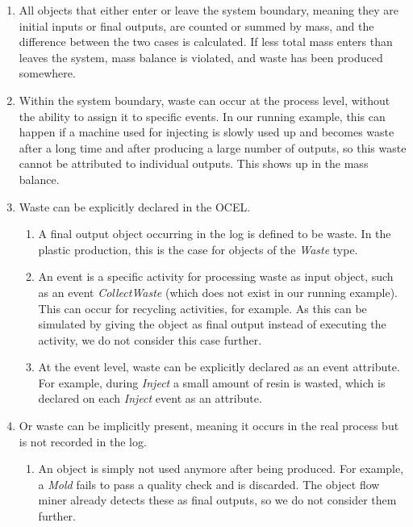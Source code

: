 \begin{enumerate}
    \item 
    \label{item:mass-balance}
    All objects that either enter or leave the system boundary, meaning they are initial inputs or final outputs, are counted or summed by mass, and the difference between the two cases is calculated.
    If less total mass enters than leaves the system, mass balance is violated, and waste has been produced somewhere.
    
    \item
    \label{item:entire-process}
    Within the system boundary, waste can occur at the process level, without the ability to assign it to specific events.
    In our running example, this can happen if a machine used for injecting is slowly used up and becomes waste after a long time and after producing a large number of outputs, so this waste cannot be attributed to individual outputs.
    This shows up in the mass balance.
    
    \item Waste can be explicitly declared in the OCEL.
    \begin{enumerate}
        \item
        A final output object occurring in the log is defined to be waste.
        In the plastic production, this is the case for objects of the \emph{Waste} type.
        
        \item
        An event is a specific activity for processing waste as input object, such as an event \emph{CollectWaste} (which does not exist in our running example).
        This can occur for recycling activities, for example.
        As this can be simulated by giving the object as final output instead of executing the activity, we do not consider this case further.

        \item
        At the event level, waste can be explicitly declared as an event attribute.
        For example, during \emph{Inject} a small amount of resin is wasted, which is declared on each \emph{Inject} event as an attribute.
    \end{enumerate}
    
    \item
    Or waste can be implicitly present, meaning it occurs in the real process but is not recorded in the log.
    \begin{enumerate}
        \item
        An object is simply not used anymore after being produced.
        For example, a \emph{Mold} fails to pass a quality check and is discarded.
        The object flow miner already detects these as final outputs, so we do not consider them further.
        

\end{enumerate}
\end{enumerate}
